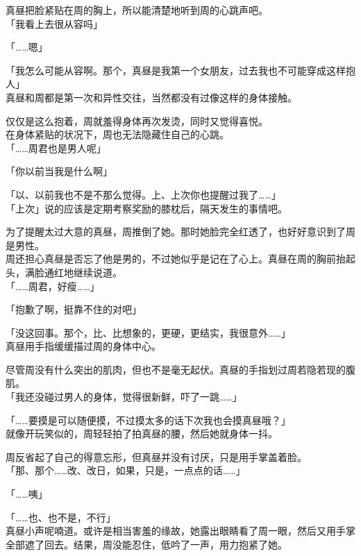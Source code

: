 真昼把脸紧贴在周的胸上，所以能清楚地听到周的心跳声吧。\\

「我看上去很从容吗」

「……嗯」

「我怎么可能从容啊。那个，真昼是我第一个女朋友，过去我也不可能穿成这样抱人」\\

真昼和周都是第一次和异性交往，当然都没有过像这样的身体接触。

仅仅是这么抱着，周就羞得身体再次发烫，同时又觉得喜悦。\\

在身体紧贴的状况下，周也无法隐藏住自己的心跳。\\

「……周君也是男人呢」

「你以前当我是什么啊」

「以、以前我也不是不那么觉得。上、上次你也提醒过我了……」\\

「上次」说的应该是定期考察奖励的膝枕后，隔天发生的事情吧。

为了提醒太过大意的真昼，周推倒了她。那时她脸完全红透了，也好好意识到了周是男性。\\

周还担心真昼是否忘了他是男的，不过她似乎是记在了心上。真昼在周的胸前抬起头，满脸通红地继续说道。\\

「……周君，好瘦……」

「抱歉了啊，挺靠不住的对吧」

「没这回事。那个，比、比想象的，更硬，更结实，我很意外……」\\

真昼用手指缓缓描过周的身体中心。

尽管周没有什么突出的肌肉，但也不是毫无起伏。真昼的手指划过周若隐若现的腹肌。\\

「我还没碰过男人的身体，觉得很新鲜，吓了一跳……」

「……要摸是可以随便摸，不过摸太多的话下次我也会摸真昼哦？」\\

就像开玩笑似的，周轻轻拍了拍真昼的腰，然后她就身体一抖。

周反省起了自己的得意忘形，但真昼并没有讨厌，只是用手掌盖着脸。\\

「那、那个……改、改日，如果，只是，一点点的话……」

「……咦」

「……也、也不是，不行」\\

真昼小声呢喃道。或许是相当害羞的缘故，她露出眼睛看了周一眼，然后又用手掌全部遮了回去。结果，周没能忍住，低吟了一声，用力抱紧了她。
